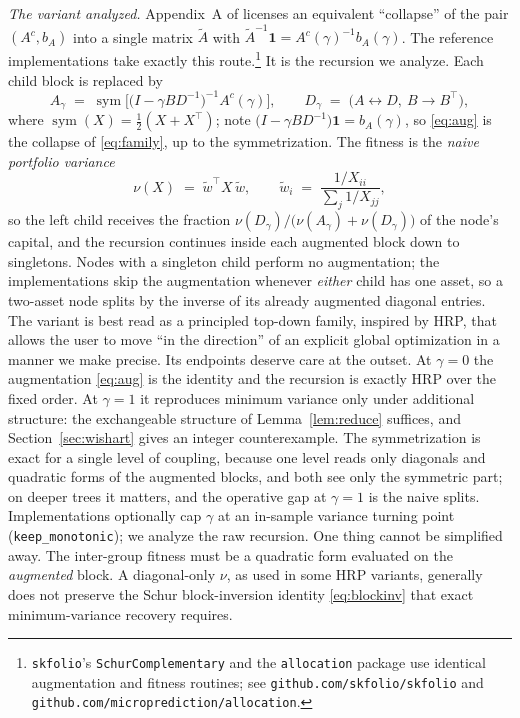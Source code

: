 \documentclass[11pt]{article}
\theoremstyle{remark}
\begin{document}
\emph{The variant analyzed.} Appendix~A of \cite{cotton2024schur} licenses an
equivalent ``collapse'' of the pair $(A^c, b_A)$ into a single matrix
$\widetilde A$ with $\widetilde A^{-1}\mathbf{1} = A^c(\gamma)^{-1}
b_A(\gamma)$. The reference implementations take exactly this
route.\footnote{\texttt{skfolio}'s \texttt{SchurComplementary} and the
\texttt{allocation} package use identical augmentation and fitness routines;
see \texttt{github.com/skfolio/skfolio} and
\texttt{github.com/microprediction/allocation}.} It is the recursion we
analyze. Each child block is replaced by
\begin{equation}
  A_\gamma \;=\; \operatorname{sym}\!\Big[\big(I - \gamma B D^{-1}\big)^{-1}
  A^c(\gamma)\Big],
  \qquad
  D_\gamma \;=\; \big(A \leftrightarrow D,\ B \to B^\top\big),
  \label{eq:aug}
\end{equation}
where $\operatorname{sym}(X) = \tfrac12(X + X^\top)$; note
$\big(I - \gamma BD^{-1}\big)\mathbf{1} = b_A(\gamma)$, so \eqref{eq:aug} is
the collapse of \eqref{eq:family}, up to the symmetrization. The fitness is
the \emph{naive portfolio variance}
\begin{equation}
  \nu(X) \;=\; \tilde w^\top X\, \tilde w,
  \qquad
  \tilde w_i \;=\; \frac{1/X_{ii}}{\sum_j 1/X_{jj}},
  \label{eq:naive}
\end{equation}
so the left child receives the fraction
$\nu(D_\gamma)/\big(\nu(A_\gamma) + \nu(D_\gamma)\big)$ of the node's
capital, and the recursion continues inside each augmented block down to
singletons. Nodes with a singleton child perform no augmentation; the
implementations skip the augmentation whenever \emph{either} child has one
asset, so a two-asset node splits by the inverse of its already augmented
diagonal entries. The variant is best read as a principled top-down
family, inspired by HRP, that allows the user to move ``in the
direction'' of an explicit global optimization in a manner we make
precise. Its endpoints deserve care at the outset. At
$\gamma = 0$ the augmentation \eqref{eq:aug} is the identity and the
recursion is exactly HRP over the fixed order. At $\gamma = 1$ it
reproduces minimum variance only under additional structure:
the exchangeable structure of Lemma~\ref{lem:reduce} suffices, and
Section~\ref{sec:wishart} gives an integer counterexample. The
symmetrization is exact for a single level of coupling, because one level
reads only diagonals and quadratic forms of the augmented blocks, and
both see only the symmetric part; on deeper trees it matters, and the
operative gap at $\gamma = 1$ is the naive splits.
Implementations optionally cap $\gamma$ at an in-sample variance turning
point (\texttt{keep\_monotonic}); we analyze the raw recursion. One thing
cannot be simplified away. The inter-group fitness must be a quadratic form
evaluated on the \emph{augmented} block. A diagonal-only $\nu$, as used in
some HRP variants, generally does not preserve the Schur block-inversion
identity \eqref{eq:blockinv} that exact minimum-variance recovery requires.
\end{document}
